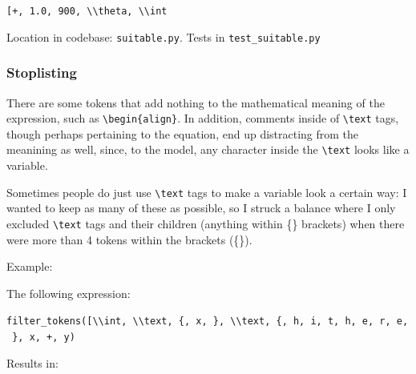 \documentclass[]{article}
\begin{document}
\texttt{{[}\textquotesingle{}+\textquotesingle{},\ \textquotesingle{}1.0\textquotesingle{},\ \textquotesingle{}900\textquotesingle{},\ \textquotesingle{}\textbackslash{}\textbackslash{}theta\textquotesingle{},\ \textquotesingle{}\textbackslash{}\textbackslash{}int\textquotesingle{}{]}}

Location in codebase: \texttt{suitable.py}. Tests in
\texttt{test\_suitable.py}

\hypertarget{stoplisting}{%
\subsubsection{Stoplisting}\label{stoplisting}}

There are some tokens that add nothing to the mathematical meaning of
the expression, such as \texttt{\textbackslash{}begin\{align\}}. In
addition, comments inside of \texttt{\textbackslash{}text} tags, though
perhaps pertaining to the equation, end up distracting from the
meanining as well, since, to the model, any character inside the
\texttt{\textbackslash{}text} looks like a variable.

Sometimes people do just use \texttt{\textbackslash{}text} tags to make
a variable look a certain way: I wanted to keep as many of these as
possible, so I struck a balance where I only excluded
\texttt{\textbackslash{}text} tags and their children (anything within
\{\} brackets) when there were more than 4 tokens within the brackets
(\{\}).

Example:

The following expression:

\texttt{filter\_tokens({[}\textquotesingle{}\textbackslash{}\textbackslash{}int\textquotesingle{},\ \textquotesingle{}\textbackslash{}\textbackslash{}text\textquotesingle{},\ \textquotesingle{}\{\textquotesingle{},\ \textquotesingle{}x\textquotesingle{},\ \textquotesingle{}\}\textquotesingle{},\ \textquotesingle{}\textbackslash{}\textbackslash{}text\textquotesingle{},\ \textquotesingle{}\{\textquotesingle{},\ \textquotesingle{}h\textquotesingle{},\ \textquotesingle{}i\textquotesingle{},\ \textquotesingle{}t\textquotesingle{},\ \textquotesingle{}h\textquotesingle{},\ \textquotesingle{}e\textquotesingle{},\ \textquotesingle{}r\textquotesingle{},\ \textquotesingle{}e\textquotesingle{},\ \textquotesingle{}\}\textquotesingle{},\ \textquotesingle{}x\textquotesingle{},\ \textquotesingle{}+\textquotesingle{},\ \textquotesingle{}y\textquotesingle{}{]})}

Results in:
\end{document}
